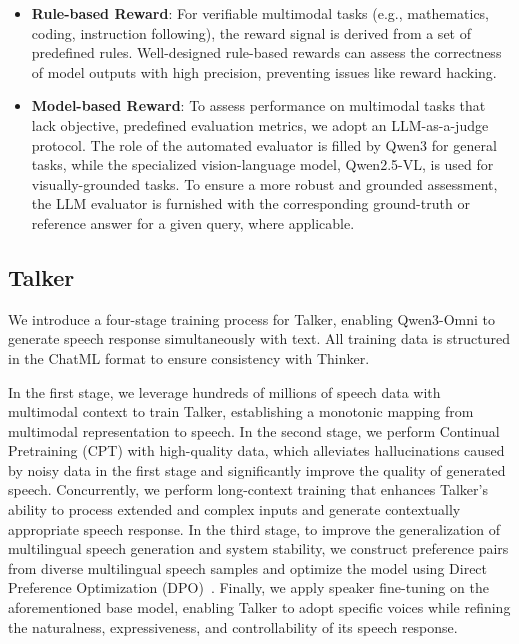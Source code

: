\begin{itemize}
    \item \textbf{Rule-based Reward}: For verifiable multimodal tasks (e.g., mathematics, coding, instruction following), the reward signal is derived from a set of predefined rules. Well-designed rule-based rewards can assess the correctness of model outputs with high precision, preventing issues like reward hacking.

    \item \textbf{Model-based Reward}: To assess performance on multimodal tasks that lack objective, predefined evaluation metrics, we adopt an LLM-as-a-judge protocol. The role of the automated evaluator is filled by Qwen3 for general tasks, while the specialized vision-language model, Qwen2.5-VL, is used for visually-grounded tasks. To ensure a more robust and grounded assessment, the LLM evaluator is furnished with the corresponding ground-truth or reference answer for a given query, where applicable.
\end{itemize}






\subsection{Talker}
We introduce a four-stage training process for Talker, enabling Qwen3-Omni to generate speech response simultaneously with text. All training data is structured in the ChatML format to ensure consistency with Thinker.

In the first stage, we leverage hundreds of millions of speech data with multimodal context to train Talker, establishing a monotonic mapping from multimodal representation to speech. In the second stage, we perform Continual Pretraining (CPT) with high-quality data, which alleviates hallucinations caused by noisy data in the first stage and significantly improve the quality of generated speech. Concurrently, we perform long-context training that enhances Talker’s ability to process extended and complex inputs and generate contextually appropriate speech response. In the third stage, to improve the generalization of multilingual speech generation and system stability, we construct preference pairs from diverse multilingual speech samples and optimize the model using Direct Preference Optimization (DPO)~\citep{rafailov2024direct}. Finally, we apply speaker fine-tuning on the aforementioned base model, enabling Talker to adopt specific voices while refining the naturalness, expressiveness, and controllability of its speech response.

